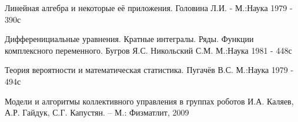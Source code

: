 \item Линейная алгебра и некоторые её приложения. \lb
Головина Л.И. - М.:Наука 1979 - 390с
\item Дифференициальные уравнения. Кратные интегралы. Ряды. \lb Функции
    комплексного переменного. \lb Бугров Я.С. Никольский С.М. 
    М.:Наука 1981 - 448с
\item Теория вероятности и математическая статистика. \lb Пугачёв В.С.
    М.:Наука 1979 - 494с

\item Модели и алгоритмы коллективного управления в группах роботов \lb
    И.А. Каляев, А.Р. Гайдук, С.Г. Капустян. – М.: Физматлит, 2009
